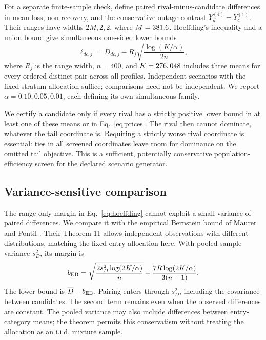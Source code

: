 \documentclass[conference,compsoc]{IEEEtran}
\begin{document}
For a separate finite-sample check, define paired rival-minus-candidate
differences in mean loss, non-recovery, and the conservative outage contrast
$Y_d^{(4)}-Y_c^{(1)}$. Their ranges have widths $2M,2,2$, where
$M=381.6$. Hoeffding's inequality and a union bound
\cite{hoeffding1963} give simultaneous one-sided lower bounds
\begin{equation}
 \ell_{dc,j}=\overline D_{dc,j}
       -R_j\sqrt{\frac{\log(K/\alpha)}{2n}}, \label{eq:hoeffding}
\end{equation}
where $R_j$ is the range width, $n=400$, and $K=276,048{}$
includes three means for every ordered distinct pair across all profiles.
Independent scenarios with the fixed stratum allocation suffice;
comparisons need not be independent. We report $\alpha=0.10,0.05,0.01$,
each defining its own simultaneous family.

We certify a candidate only if every rival has a strictly positive lower
bound in at least one of these means or in Eq.~\ref{eq:prices}. The rival
then cannot dominate, whatever the tail coordinate is. Requiring a strictly
worse rival coordinate is essential: ties in all screened coordinates leave
room for dominance on the omitted tail objective. This is a sufficient,
potentially conservative population-efficiency screen for the declared
scenario generator.

\subsection{Variance-sensitive comparison}
The range-only margin in Eq.~\ref{eq:hoeffding} cannot exploit a small
variance of paired differences. We compare it with the empirical Bernstein
bound of Maurer and Pontil \cite{maurer2009}. Their Theorem 11 allows
independent observations with different distributions, matching the fixed
entry allocation here. With pooled sample variance $s^2_D$, its margin is
\begin{equation}
 b_{\rm EB}=\sqrt{\frac{2s_D^2\log(2K/\alpha)}{n}}
       +\frac{7R\log(2K/\alpha)}{3(n-1)}.
 \label{eq:bernstein}
\end{equation}
The lower bound is $\overline D-b_{\rm EB}$. Pairing enters through
$s_D^2$, including the covariance between candidates. The second term remains
even when the observed differences are constant. The pooled variance may also
include differences between entry-category means; the theorem permits this
conservatism without treating the allocation as an i.i.d. mixture sample.
\end{document}
